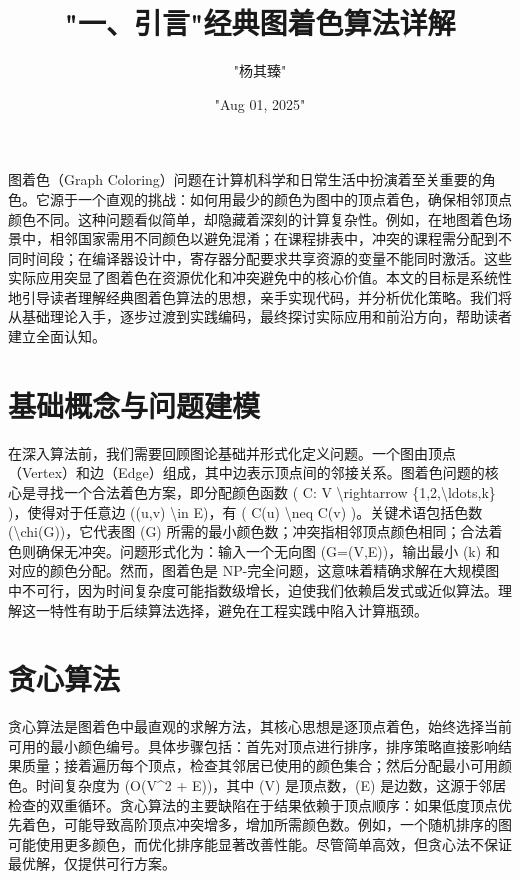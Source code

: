 \title{"一、引言"}
\author{"杨其臻"}
\date{"Aug 01, 2025"}
\maketitle
图着色（Graph Coloring）问题在计算机科学和日常生活中扮演着至关重要的角色。它源于一个直观的挑战：如何用最少的颜色为图中的顶点着色，确保相邻顶点颜色不同。这种问题看似简单，却隐藏着深刻的计算复杂性。例如，在地图着色场景中，相邻国家需用不同颜色以避免混淆；在课程排表中，冲突的课程需分配到不同时间段；在编译器设计中，寄存器分配要求共享资源的变量不能同时激活。这些实际应用突显了图着色在资源优化和冲突避免中的核心价值。本文的目标是系统性地引导读者理解经典图着色算法的思想，亲手实现代码，并分析优化策略。我们将从基础理论入手，逐步过渡到实践编码，最终探讨实际应用和前沿方向，帮助读者建立全面认知。\par
\chapter{基础概念与问题建模}
在深入算法前，我们需要回顾图论基础并形式化定义问题。一个图由顶点（Vertex）和边（Edge）组成，其中边表示顶点间的邻接关系。图着色问题的核心是寻找一个合法着色方案，即分配颜色函数 ( C: V \textbackslash{}rightarrow \{{}1,2,\textbackslash{}ldots,k\}{} )，使得对于任意边 ((u,v) \textbackslash{}in E)，有 ( C(u) \textbackslash{}neq C(v) )。关键术语包括色数 (\textbackslash{}chi(G))，它代表图 (G) 所需的最小颜色数；冲突指相邻顶点颜色相同；合法着色则确保无冲突。问题形式化为：输入一个无向图 (G=(V,E))，输出最小 (k) 和对应的颜色分配。然而，图着色是 NP-完全问题，这意味着精确求解在大规模图中不可行，因为时间复杂度可能指数级增长，迫使我们依赖启发式或近似算法。理解这一特性有助于后续算法选择，避免在工程实践中陷入计算瓶颈。\par
\title{经典图着色算法详解}
\chapter{贪心算法}
贪心算法是图着色中最直观的求解方法，其核心思想是逐顶点着色，始终选择当前可用的最小颜色编号。具体步骤包括：首先对顶点进行排序，排序策略直接影响结果质量；接着遍历每个顶点，检查其邻居已使用的颜色集合；然后分配最小可用颜色。时间复杂度为 (O(V\^{}2 + E))，其中 (V) 是顶点数，(E) 是边数，这源于邻居检查的双重循环。贪心算法的主要缺陷在于结果依赖于顶点顺序：如果低度顶点优先着色，可能导致高阶顶点冲突增多，增加所需颜色数。例如，一个随机排序的图可能使用更多颜色，而优化排序能显著改善性能。尽管简单高效，但贪心法不保证最优解，仅提供可行方案。\par
